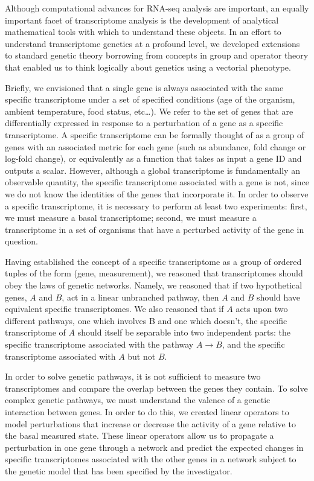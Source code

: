 \documentclass[9pt,twocolumn,twoside]{pnas-new}
\begin{document}
Although computational advances for RNA-seq analysis are important, an equally
important facet of transcriptome analysis is the development of analytical
mathematical tools with which to understand these objects. In an effort to
understand transcriptome genetics at a profound level, we developed extensions
to standard genetic theory borrowing from concepts in group and operator theory
that enabled us to think logically about genetics using a vectorial phenotype.

Briefly, we envisioned that a single gene is always associated with the same
specific transcriptome under a set of specified conditions (age of the organism,
ambient temperature, food status, etc\dots). We refer to the set of genes that
are differentially expressed in response to a perturbation of a gene as a
specific transcriptome. A specific transcriptome can be formally thought of as a
group of genes with an associated metric for each gene (such as abundance, fold
change or log-fold change), or equivalently as a function that takes as input a
gene ID and outputs a scalar.
However, although a global transcriptome is fundamentally an observable quantity,
the specific transcriptome associated with a gene is not, since we do not know
the identities of the genes that incorporate it. In order to observe a specific
transcriptome, it is necessary to perform at least two experiments: first, we
must measure a basal transcriptome; second, we must measure a transcriptome in
a set of organisms that have a perturbed activity of the gene in question.

Having established the concept of a specific transcriptome as a group of ordered
tuples of the form (gene, measurement), we reasoned that transcriptomes should
obey the laws of genetic networks. Namely, we reasoned that if two hypothetical
genes, $A$ and $B$, act in a linear unbranched pathway, then $A$ and $B$ should
have equivalent specific transcriptomes. We also reasoned that if $A$ acts upon
two different pathways, one which involves B and one which doesn't, the specific
transcriptome of $A$ should itself be separable into two independent parts: the
specific transcriptome associated with the pathway $A\rightarrow B$, and the
specific transcriptome associated with $A$ but not $B$.

In order to solve genetic pathways, it is not sufficient to measure two
transcriptomes and compare the overlap between the genes they contain. To solve
complex genetic pathways, we must understand the valence of a genetic interaction
between genes. In order to do this, we created linear operators to model
perturbations that increase or decrease the activity of a gene relative to the
basal measured state. These linear operators allow us to propagate a
perturbation in one gene through a network and predict the expected changes in
specific transcriptomes associated with the other genes in a network subject to
the genetic model that has been specified by the investigator.
\end{document}
